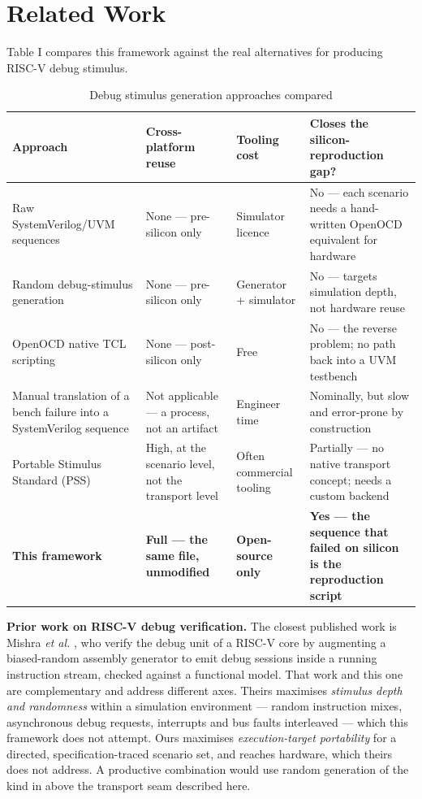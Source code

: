 \documentclass[conference]{IEEEtran}
\begin{document}
\section{Related Work}
Table I compares this framework against the real alternatives for producing RISC-V debug stimulus.

\begin{table}[!t]
\caption{Debug stimulus generation approaches compared}
\label{tab:I}
\centering
\footnotesize
\begin{tabular}{p{}p{}p{}p{}}
\toprule
Approach & Cross-platform reuse & Tooling cost & Closes the silicon-reproduction gap? \\
\midrule
Raw SystemVerilog/UVM sequences & None --- pre-silicon only & Simulator licence & No --- each scenario needs a hand-written OpenOCD equivalent for hardware \\
Random debug-stimulus generation \cite{b2} & None --- pre-silicon only & Generator + simulator & No --- targets simulation depth, not hardware reuse \\
OpenOCD native TCL scripting & None --- post-silicon only & Free & No --- the reverse problem; no path back into a UVM testbench \\
Manual translation of a bench failure into a SystemVerilog sequence & Not applicable --- a process, not an artifact & Engineer time & Nominally, but slow and error-prone by construction \\
Portable Stimulus Standard (PSS) \cite{b3} & High, at the scenario level, not the transport level & Often commercial tooling & Partially --- no native transport concept; needs a custom backend \\
\textbf{This framework} & \textbf{Full --- the same file, unmodified} & \textbf{Open-source only} & \textbf{Yes --- the sequence that failed on silicon is the reproduction script} \\
\bottomrule
\end{tabular}
\end{table}

\textbf{Prior work on RISC-V debug verification.} The closest published work is Mishra \textit{et al.} \cite{b2}, who verify the debug unit of a RISC-V core by augmenting a biased-random assembly generator to emit debug sessions inside a running instruction stream, checked against a functional model. That work and this one are complementary and address different axes. Theirs maximises \textit{stimulus depth and randomness} within a simulation environment --- random instruction mixes, asynchronous debug requests, interrupts and bus faults interleaved --- which this framework does not attempt. Ours maximises \textit{execution-target portability} for a directed, specification-traced scenario set, and reaches hardware, which theirs does not address. A productive combination would use random generation of the kind in \cite{b2} above the transport seam described here.
\end{document}
